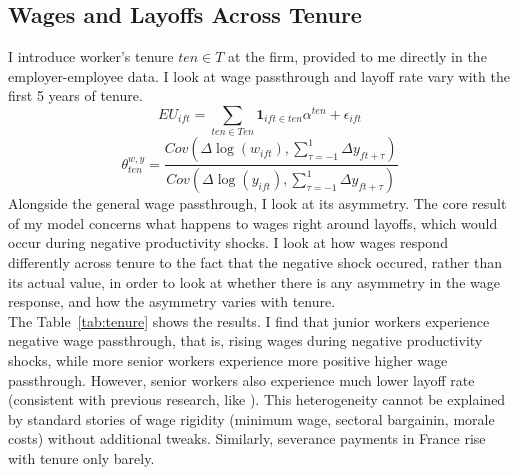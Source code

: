 \subsection*{Wages and Layoffs Across Tenure} %
I introduce worker's tenure $ten \in T$ at the firm, provided to me directly in the employer-employee data. I look at wage passthrough and layoff rate vary with the first 5 years of tenure.
\[ EU_{ift} = \sum_{ten \in Ten} \mathbf{1}_{ift \in ten}\alpha^{ten}  + \epsilon_{ift}\] 
\[\theta^{w,y}_{ten} = \frac{Cov(\Delta \log(w_{ift}),\sum_{\tau=-1}^1 \Delta y_{ft+\tau})}{Cov(\Delta \log(y_{ift}),\sum_{\tau=-1}^1 \Delta y_{ft+\tau})}\]
Alongside the general wage passthrough, I look at its asymmetry. The core result of my model concerns what happens to wages right around layoffs, which would occur during negative productivity shocks. I look at how wages respond differently across tenure to the fact that the negative shock occured, rather than its actual value, in order to look at whether there is any asymmetry in the wage response, and how the asymmetry varies with tenure. \\
The Table~\ref{tab:tenure} shows the results. I find that junior workers experience negative wage passthrough, that is, rising wages during negative productivity shocks, while more senior workers experience more positive higher wage passthrough. However, senior workers also experience much lower layoff rate (consistent with previous research, like \textcite{buhai2014}). This heterogeneity cannot be explained by standard stories of wage rigidity (minimum wage, sectoral bargainin, morale costs) without additional tweaks. Similarly, severance payments in France rise with tenure only barely. 

